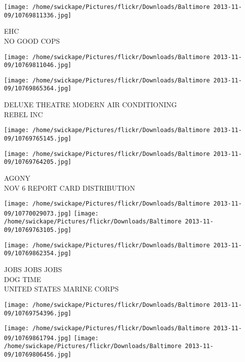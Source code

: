 \documentclass[10pt,letterpaper]{article}
\begin{document}
\vspace{0.25in}
\texttt{[image: /home/swickape/Pictures/flickr/Downloads/Baltimore 2013-11-09/10769811336.jpg]}

EHC\\
NO GOOD COPS\\
\pagebreak

\texttt{[image: /home/swickape/Pictures/flickr/Downloads/Baltimore 2013-11-09/10769811046.jpg]}

\vspace{0.25in}
\texttt{[image: /home/swickape/Pictures/flickr/Downloads/Baltimore 2013-11-09/10769865364.jpg]}

DELUXE THEATRE MODERN AIR CONDITIONING\\
REBEL INC\\
\pagebreak

\texttt{[image: /home/swickape/Pictures/flickr/Downloads/Baltimore 2013-11-09/10769765145.jpg]}

\vspace{0.25in}
\texttt{[image: /home/swickape/Pictures/flickr/Downloads/Baltimore 2013-11-09/10769764205.jpg]}

AGONY\\
NOV 6 REPORT CARD DISTRIBUTION\\
\pagebreak

\texttt{[image: /home/swickape/Pictures/flickr/Downloads/Baltimore 2013-11-09/10770029073.jpg]}
\texttt{[image: /home/swickape/Pictures/flickr/Downloads/Baltimore 2013-11-09/10769763105.jpg]}

\vspace{0.25in}
\texttt{[image: /home/swickape/Pictures/flickr/Downloads/Baltimore 2013-11-09/10769862354.jpg]}

JOBS JOBS JOBS\\
DOG TIME\\
UNITED STATES MARINE CORPS\\
\pagebreak

\texttt{[image: /home/swickape/Pictures/flickr/Downloads/Baltimore 2013-11-09/10769754396.jpg]}

\vspace{0.25in}
\texttt{[image: /home/swickape/Pictures/flickr/Downloads/Baltimore 2013-11-09/10769861794.jpg]}
\texttt{[image: /home/swickape/Pictures/flickr/Downloads/Baltimore 2013-11-09/10769806456.jpg]}
\end{document}
